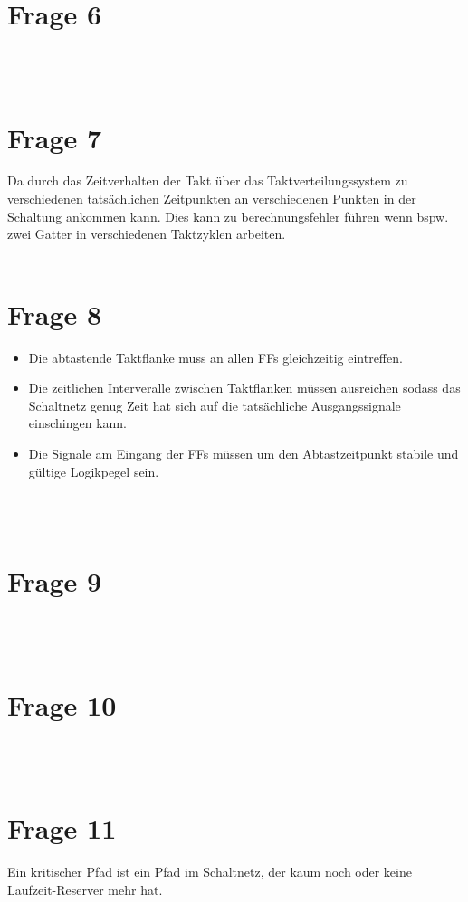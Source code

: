 \documentclass[a4paper]{scrartcl}
\newcounter{punkte}
\begin{document}
\section*{Frage 6}

~\\
~\\
\section*{Frage 7}
Da durch das Zeitverhalten der Takt über das Taktverteilungssystem zu verschiedenen tatsächlichen Zeitpunkten an verschiedenen Punkten in der Schaltung ankommen kann. Dies kann zu berechnungsfehler führen wenn bspw. zwei Gatter in verschiedenen Taktzyklen arbeiten.
~\\
~\\
\section*{Frage 8}
\begin{itemize}
	\item Die abtastende Taktflanke muss an allen FFs gleichzeitig eintreffen.
	\item Die zeitlichen Interveralle zwischen Taktflanken müssen ausreichen sodass das Schaltnetz genug Zeit hat sich auf die tatsächliche Ausgangssignale einschingen kann.
	\item Die Signale am Eingang der FFs müssen um den Abtastzeitpunkt stabile und gültige Logikpegel sein.
\end{itemize}
~\\
~\\
\section*{Frage 9}

~\\
~\\
\section*{Frage 10}

~\\
~\\
\section*{Frage 11}
Ein kritischer Pfad ist ein Pfad im Schaltnetz, der kaum noch oder keine Laufzeit-Reserver mehr hat.
~\\
~\\
\end{document}
